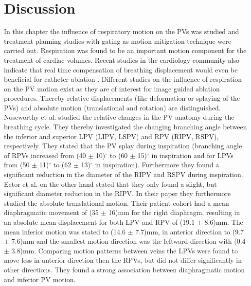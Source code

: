 \documentclass[type=dr, dr=rernat, accentcolor=tud7b,colorbacktitle, bigchapter, openright, twoside, 12pt ]{tudthesis}
\begin{document}
\newpage

\section{Discussion}
In this chapter the influence of respiratory motion on the PVs was studied and treatment planning studies with gating as motion 
mitigation technique were carried out. Respiration was found to be an important motion component for the treatment of cardiac volumes. 
Recent studies in the cardiology community also indicate that real time compensation of breathing displacement 
would even be beneficial for catheter ablation \cite{Kum12} \cite{Frie12}.\newline
\newline
Different studies on the influence of respiration on the PV motion exist as they are of interest for image guided ablation procedures. 
Thereby relative displacements (like deformation or splaying of the PVs) and absolute motion (translational and rotation) are distinguished. 
Noseworthy et al. \cite{Nos05} studied the relative changes in the PV anatomy during the breathing cycle. They thereby investigated the changing 
branching angle between the inferior and superior LPV (LIPV, LSPV) and RPV (RIPV, RSPV), respectively. They stated that the PV splay during 
inspiration (branching angle of RPVs increased from (40 $\pm$ 10)$^\circ$ to (60 $\pm$ 15)$^\circ$ in inspiration and for LPVs 
from (50 $\pm$ 11)$^\circ$ to (62 $\pm$ 13)$^\circ$ in inspiration). Furthermore they found a significant reduction in 
the diameter of the RIPV and RSPV during inspiration. Ector et al. \cite{Ect08} on the other hand stated that they only found a slight, 
but significant diameter reduction in the RIPV. In their paper they furthermore studied the absolute translational motion. 
Their patient cohort had a mean diaphragmatic movement of (35 $\pm$ 16)mm for the right diaphragm, resulting in an absolute mean displacement 
for both LPV and RPV of (19.1 $\pm$ 8.6)mm. The mean inferior motion was stated 
to (14.6 $\pm$ 7.7)mm, in anterior direction to (9.7 $\pm$ 7.6)mm and the smallest motion direction was the leftward direction with 
(0.4 $\pm$ 3.8)mm. Comparing motion patterns between veins the LPVs were found to move less in anterior direction then the RPVs, but did 
not differ significantly in other directions. They found a strong association between diaphragmatic motion and inferior PV motion.\newline
\newline
\end{document}

